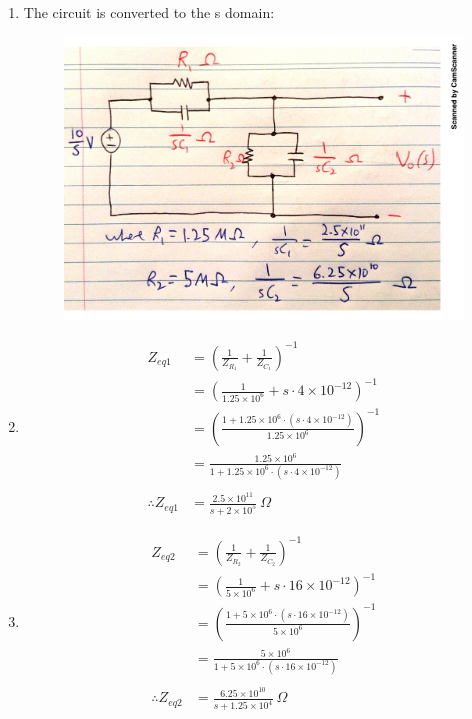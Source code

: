 

\begin{enumerate}
	\item{
	The circuit is converted to the s domain:
	\begin{figure}[H]
		\centering
		\includegraphics[scale=0.54]{q1a.pdf}
	\end{figure}
	}

	\item{
		\begin{align*}
			Z_{eq1} &= \left( \frac{1}{Z_{R_1}} +								%
			\frac{1}{Z_{C_1}} \right)^{-1} \\
			&= \left(\frac{1}{1.25 \times 10^6} + 								%
			s \cdot 4 \times 10^{-12}\right)^{-1} \\
			&= \left(\frac{1 + 1.25\times 10^6 \cdot (s \cdot 4 \times 10^{-12})%
			}{ 1.25\times 10^6} \right)^{-1} \\
			&= \frac{1.25\times 10^6}{1 + 1.25\times 10^6 						%
			\cdot (s \cdot 4 \times 10^{-12})} \\ 
			\\
			\therefore Z_{eq1} &= \frac{2.5 \times 10^{11}}{s + 2 \times 10^5} \ \Omega
		\end{align*}
	}

	\item{
		\begin{align*}
			Z_{eq2} &= \left( \frac{1}{Z_{R_2}} +								%
			\frac{1}{Z_{C_2}} \right)^{-1} \\
			&= \left( \frac{1}{5\times 10^6} +									%
			s \cdot 16 \times 10^{-12} \right)^{-1} \\
			&= \left( \frac{1 + 5\times 10^6 \cdot								%
			(s \cdot 16 \times 10^{-12})}{5\times 10^6} \right)^{-1} \\
			&= \frac{5 \times 10^6}{1 + 5\times 10^6 							%
			\cdot(s \cdot 16 \times 10^{-12})} \\
			\\
			\therefore Z_{eq2} &= \frac{6.25 \times 10^{10}}{s + 1.25 \times 10^4} \ \Omega
		\end{align*}
		\\
	}


\end{enumerate}
